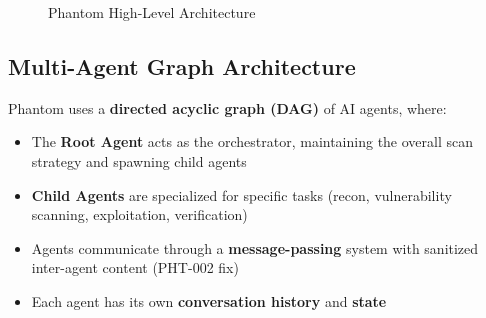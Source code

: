 \documentclass[12pt,a4paper]{article}
\begin{document}
\begin{figure}[H]
\caption{Phantom High-Level Architecture}
\label{fig:arch}
\end{figure}

\subsection{Multi-Agent Graph Architecture}

Phantom uses a \textbf{directed acyclic graph (DAG)} of AI agents, where:

\begin{itemize}[nosep]
    \item The \textbf{Root Agent} acts as the orchestrator, maintaining the
          overall scan strategy and spawning child agents
    \item \textbf{Child Agents} are specialized for specific tasks (recon,
          vulnerability scanning, exploitation, verification)
    \item Agents communicate through a \textbf{message-passing} system with
          sanitized inter-agent content (PHT-002 fix)
    \item Each agent has its own \textbf{conversation history} and \textbf{state}
\end{itemize}
\end{document}
